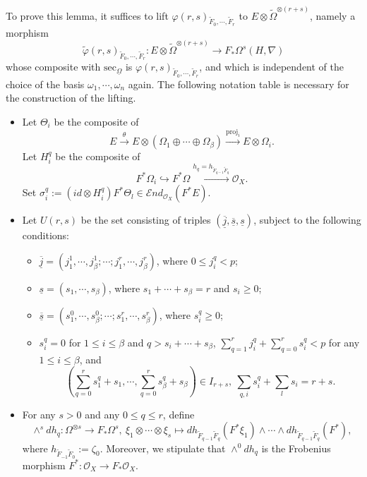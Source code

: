 \documentclass[12pt, a4paper]{article}
\begin{document}
To prove this lemma, it suffices to lift $\varphi(r,s)_{\tilde F_0,\cdots,\tilde F_r}$ to $E\otimes\tilde\Omega^{\otimes(r+s)}$, namely a morphism
$$
\tilde\varphi(r,s)_{\tilde F_0,\cdots,\tilde F_r}:E\otimes\tilde\Omega^{\otimes(r+s)}\to F_*\Omega^s(H,\nabla)
$$
whose composite with $\mathrm{sec}_{\underline\Omega}$ is $\varphi(r,s)_{\tilde F_0,\cdots,\tilde F_r}$, and
which is independent of the choice of the basis $\omega_1,\cdots,\omega_n$ again. The following notation table is necessary for the construction of the lifting.
\begin{itemize}

    \item Let $\Theta_i$ be the composite of
    $$
    E\stackrel{\theta}{\to}E\otimes(\Omega_1\oplus\cdots\oplus\Omega_\beta)\xrightarrow{\mathrm{proj}_i} E\otimes\Omega_i.
    $$
    Let $H_i^q$ be the composite of
    $$
    F^*\Omega_i\hookrightarrow F^*\Omega\xrightarrow{h_q=h_{\tilde F_{q-1}\tilde F_q}}\mathcal O_X.
    $$
    Set $\sigma^q_i:=(id\otimes H^q_i)F^*\Theta_l\in\mathcal End_{\mathcal O_X}(F^*E)$.
    
    \item Let $U(r,s)$ be the set consisting of triples $(\overline{\underline j},\overline{\underline s},\underline s)$, subject to the following conditions:
\begin{itemize}
    \item $\overline{\underline j}=(j^1_1,\cdots,j^1_\beta;\cdots;j^r_1,\cdots,j^r_\beta)$, where $0\leq j^q_i<p$;
    \item $\underline s=(s_1,\cdots,s_\beta)$, where $s_1+\cdots+s_\beta=r$ and $s_i\geq0$;
 \item $\overline{\underline s}=(s^0_1,\cdots,s^0_\beta;\cdots;s^r_1,\cdots,s^r_\beta)$, where $s^q_i\geq 0$;
 \item $s^q_i=0$ for $1\leq i\leq \beta$ and $q>s_i+\cdots+s_\beta$, $\sum_{q=1}^rj^q_i+\sum_{q=0}^rs_i^q<p$ for any $1\leq i\leq \beta$, and 
     $$(\sum_{q=0}^rs^q_1+s_1,\cdots,\sum_{q=0}^rs^q_\beta+s_\beta)\in I_{r+s},~\sum_{q,i}s^q_i+\sum_l s_i=r+s.$$ 
       \end{itemize}    
    
 \item
    For any $s>0$ and any $0\leq q\leq r$, define 
 $$
 \wedge^sdh_q:\Omega^{\otimes s}\to F_*\Omega^s,~\xi_1\otimes\cdots\otimes\xi_s\mapsto dh_{\tilde F_{q-1}\tilde F_q}(F^*\xi_1)\wedge\cdots\wedge dh_{\tilde F_{q-1}\tilde F_q}(F^*),
 $$
 where $h_{\tilde F_{-1}\tilde F_0}:=\zeta_0$. Moreover, we stipulate that $\wedge^0dh_q$ is the Frobenius morphism $F^*:\mathcal O_X\to F_*\mathcal O_X$.
   

\end{itemize}
\end{document}
